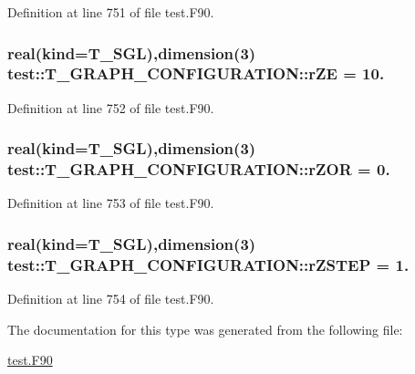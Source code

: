 Definition at line 751 of file test.F90.

\hypertarget{typetest_1_1_t___g_r_a_p_h___c_o_n_f_i_g_u_r_a_t_i_o_n_a9f5a590f28b914ab67930cb496279ca5}{
\subsubsection[{rZE}]{\setlength{\rightskip}{0pt plus 5cm}real(kind={\bf T\_\-SGL}),dimension(3) {\bf test::T\_\-GRAPH\_\-CONFIGURATION::rZE} = 10.}}
\label{typetest_1_1_t___g_r_a_p_h___c_o_n_f_i_g_u_r_a_t_i_o_n_a9f5a590f28b914ab67930cb496279ca5}


Definition at line 752 of file test.F90.

\hypertarget{typetest_1_1_t___g_r_a_p_h___c_o_n_f_i_g_u_r_a_t_i_o_n_a061f814d372b4d8df2a5079b38693f95}{
\subsubsection[{rZOR}]{\setlength{\rightskip}{0pt plus 5cm}real(kind={\bf T\_\-SGL}),dimension(3) {\bf test::T\_\-GRAPH\_\-CONFIGURATION::rZOR} = 0.}}
\label{typetest_1_1_t___g_r_a_p_h___c_o_n_f_i_g_u_r_a_t_i_o_n_a061f814d372b4d8df2a5079b38693f95}


Definition at line 753 of file test.F90.

\hypertarget{typetest_1_1_t___g_r_a_p_h___c_o_n_f_i_g_u_r_a_t_i_o_n_af0b69b8e486897a38def90e2848c544f}{
\subsubsection[{rZSTEP}]{\setlength{\rightskip}{0pt plus 5cm}real(kind={\bf T\_\-SGL}),dimension(3) {\bf test::T\_\-GRAPH\_\-CONFIGURATION::rZSTEP} = 1.}}
\label{typetest_1_1_t___g_r_a_p_h___c_o_n_f_i_g_u_r_a_t_i_o_n_af0b69b8e486897a38def90e2848c544f}


Definition at line 754 of file test.F90.



The documentation for this type was generated from the following file:\begin{DoxyCompactItemize}
\item 
\hyperlink{test_8_f90}{test.F90}\end{DoxyCompactItemize}
